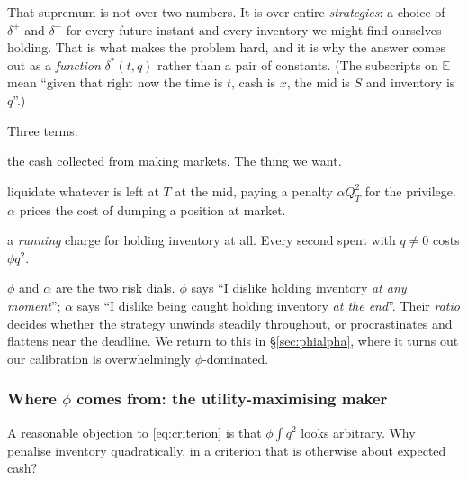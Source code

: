 \documentclass[11pt,a4paper]{article}
\newcommand{\dplus}{\delta^{+}}
\newcommand{\dminus}{\delta^{-}}
\begin{document}
That supremum is not over two numbers. It is over entire \emph{strategies}: a
choice of $\dplus$ and $\dminus$ for every future instant and every inventory we
might find ourselves holding. That is what makes the problem hard, and it is why
the answer comes out as a \emph{function} $\delta^{*}(t,q)$ rather than a pair
of constants. (The subscripts on $\mathbb{E}$ mean ``given that right now the
time is $t$, cash is $x$, the mid is $S$ and inventory is $q$''.)

Three terms:

\begin{description}[leftmargin=1.4cm,style=nextline]
\item[$X^{\delta}_T$] the cash collected from making markets. The thing we want.
\item[$Q_T(S_T - \alpha Q_T)$] liquidate whatever is left at $T$ at the mid,
  paying a penalty $\alpha Q_T^2$ for the privilege. $\alpha$ prices the cost of
  dumping a position at market.
\item[$-\phi\int (Q_u)^2 du$] a \emph{running} charge for holding inventory at
  all. Every second spent with $q \ne 0$ costs $\phi q^2$.
\end{description}

\begin{intuition}
$\phi$ and $\alpha$ are the two risk dials. $\phi$ says ``I dislike holding
inventory \emph{at any moment}''; $\alpha$ says ``I dislike being caught holding
inventory \emph{at the end}''. Their \emph{ratio} decides whether the strategy
unwinds steadily throughout, or procrastinates and flattens near the deadline.
We return to this in \S\ref{sec:phialpha}, where it turns out our calibration is
overwhelmingly $\phi$-dominated.
\end{intuition}

\subsubsection{Where \texorpdfstring{$\phi$}{phi} comes from: the utility-maximising maker}
\label{sec:utility}

A reasonable objection to \eqref{eq:criterion} is that $\phi\int q^2$ looks
arbitrary. Why penalise inventory quadratically, in a criterion that is otherwise
about expected cash?
\end{document}
